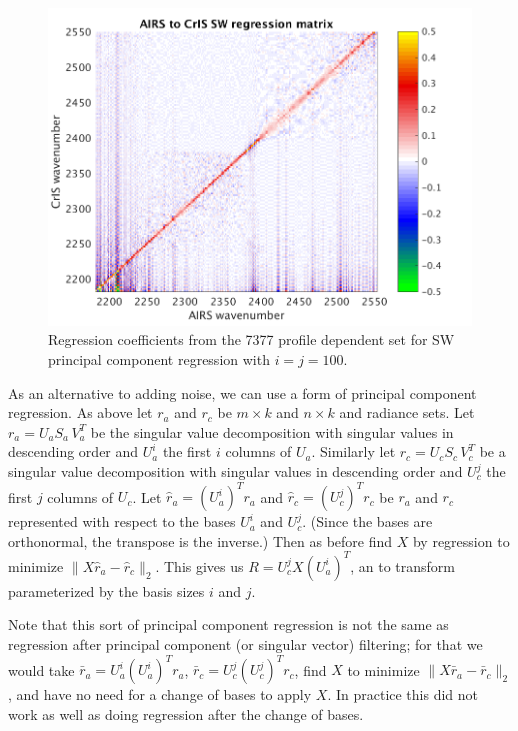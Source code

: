 \documentclass[10pt,twocolumn]{article}
\begin{document}
\begin{figure} %
  \centering
  \includegraphics[width=\linewidth]{figures/SW_pc_regr_mat.png}
  \caption{Regression coefficients from the 7377 profile dependent
    set for SW principal component regression with $i = j = 100$.}
  \label{dreg9}
\end{figure}

As an alternative to adding noise, we can use a form of principal
component regression.  As above let $r_a$ and $r_c$ be $m \times k$
and $n \times k$ {\airs} and {\cris} radiance sets.  Let $r_a = U_a
S_a\,V_a^T$ be the singular value decomposition with singular values
in descending order and $U_a^i$ the first $i$ columns of $U_a$.
Similarly let $r_c = U_c S_c\,V_c^T$ be a singular value
decomposition with singular values in descending order and $U_c^j$
the first $j$ columns of $U_c$.  Let $\hat r_a = (U_a^i)^T r_a$ and
$\hat r_c = (U_c^j)^T r_c$ be $r_a$ and $r_c$ represented with
respect to the bases $U_a^i$ and $U_c^j$.  (Since the bases are
orthonormal, the transpose is the inverse.)  Then as before find $X$
by regression to minimize $\|X \hat r_a - \hat r_c\|_2$.  This gives
us $R = U_c^j X (U_a^i)^T$, an {\airs} to {\cris} transform
parameterized by the basis sizes $i$ and $j$.


Note that this sort of principal component regression is not the
same as regression after principal component (or singular vector)
filtering; for that we would take $\bar r_a = U_a^i (U_a^i)^T r_a$,
$\bar r_c = U_c^j (U_c^j)^T r_c$, find $X$ to minimize $\|X \bar r_a
- \bar r_c\|_2$, and have no need for a change of bases to apply
$X$.  In practice this did not work as well as doing regression
after the change of bases.
\end{document}
